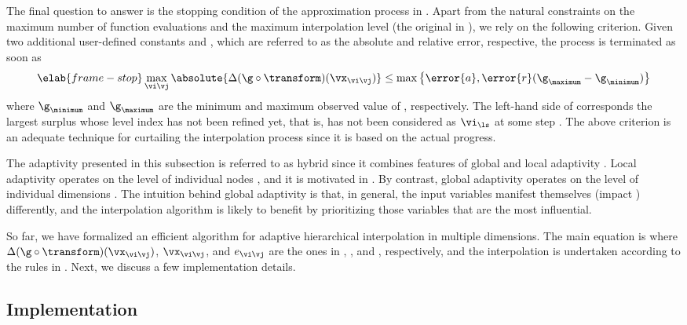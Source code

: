 The final question to answer is the stopping condition of the approximation
process in . Apart from the natural constraints on the
maximum number of function evaluations and the maximum interpolation level (the
original \ls in ), we rely on the following
criterion. Given two additional user-defined constants  and ,
which are referred to as the absolute and relative error, respective, the
process is terminated as soon as
\begin{equation} \elab{frame-stop}
  \max_{\vi \vj} \absolute{\Delta(\g \circ \transform)(\vx_{\vi \vj})} \leq \max \left\{ \error{a}, \error{r} (\g_\maximum - \g_\minimum) \right\}
\end{equation}
where $\g_\minimum$ and $\g_\maximum$ are the minimum and maximum observed value
of \g, respectively. The left-hand side of  corresponds the
largest surplus whose level index has not been refined yet, that is, has not
been considered as $\vi_{\ls}$ at some step \ls. The above criterion is an
adequate technique for curtailing the interpolation process since it is based on
the actual progress.

The adaptivity presented in this subsection is referred to as hybrid since it
combines features of global and local adaptivity \cite{jakeman2012}. Local
adaptivity operates on the level of individual nodes \cite{ma2009}, and it is
motivated in . By contrast, global adaptivity operates on
the level of individual dimensions \cite{klimke2006}. The intuition behind
global adaptivity is that, in general, the input variables manifest themselves
(impact \g) differently, and the interpolation algorithm is likely to benefit by
prioritizing those variables that are the most influential.

\conclusioncut
So far, we have formalized an efficient algorithm for adaptive hierarchical
interpolation in multiple dimensions. The main equation is
 where $\Delta(\g \circ \transform)(\vx_{\vi \vj})$,
$\vx_{\vi \vj}$, and $e_{\vi \vj}$ are the ones in
, , and ,
respectively, and the interpolation is undertaken according to the rules in
. Next, we discuss a few implementation details.

\subsection{Implementation}


